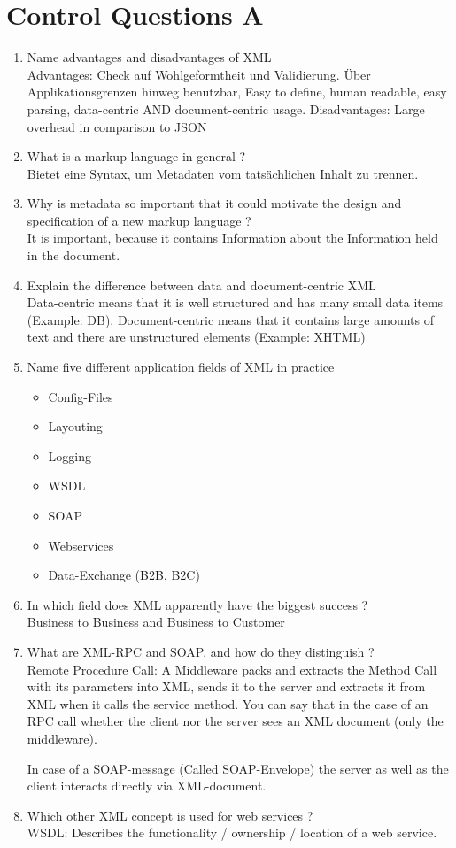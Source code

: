 \section{Control Questions A}
\begin{enumerate}
\item Name advantages and disadvantages of XML\\
Advantages: Check auf Wohlgeformtheit und Validierung. Über Applikationsgrenzen hinweg benutzbar, Easy to define, human readable, easy parsing, data-centric AND document-centric usage. Disadvantages: Large overhead in comparison to JSON
\item What is a markup language in general ?\\
Bietet eine Syntax, um Metadaten vom tatsächlichen Inhalt zu trennen.
\item Why is metadata so important that it could motivate the design and specification of a new markup language ?\\
It is important, because it contains Information about the Information held in the document.
\item Explain the difference between data and document-centric XML\\
Data-centric means that it is well structured and has many small data items (Example: DB). Document-centric means that it contains large amounts of text and there are unstructured elements (Example: XHTML)
\item Name five different application fields of XML in practice
\begin{itemize}
\item Config-Files
\item Layouting
\item Logging
\item WSDL
\item SOAP
\item Webservices
\item Data-Exchange (B2B, B2C)
\end{itemize}
\item In which field does XML apparently have the biggest success ?\\
Business to Business and Business to Customer
\item What are XML-RPC and SOAP, and how do they distinguish ?\\
Remote Procedure Call: A Middleware packs and extracts the Method Call with its parameters into XML, sends it to the server and extracts it from XML when it calls the service method. You can say that in the case of an RPC call whether the client nor the server sees an XML document (only the middleware).

In case of a SOAP-message (Called SOAP-Envelope) the server as well as the client interacts directly via XML-document.
\item Which other XML concept is used for web services ?\\
WSDL: Describes the functionality / ownership / location of a web service.
\end{enumerate}

